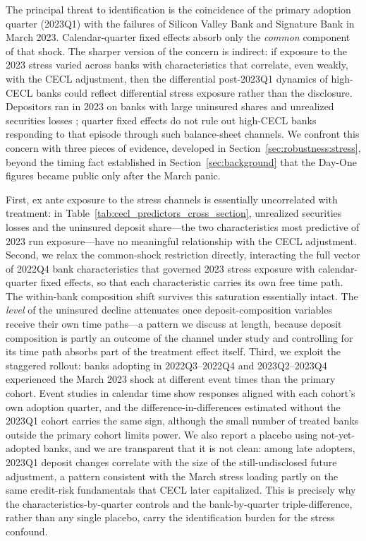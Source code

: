 The principal threat to identification is the coincidence of the primary
adoption quarter (2023Q1) with the failures of Silicon Valley Bank and
Signature Bank in March 2023.  Calendar-quarter fixed effects absorb only the
\emph{common} component of that shock.  The sharper version of the concern is
indirect: if exposure to the 2023 stress varied across banks with
characteristics that correlate, even weakly, with the CECL adjustment, then
the differential post-2023Q1 dynamics of high-CECL banks could reflect
differential stress exposure rather than the disclosure.  Depositors ran in
2023 on banks with large uninsured shares and unrealized securities losses
\citep{caglio2024depositors, jiang2024monetary}; quarter fixed effects do not
rule out high-CECL banks responding to that episode through such balance-sheet
channels.  We confront this concern with three pieces of evidence, developed
in Section~\ref{sec:robustness:stress}, beyond the timing fact established in
Section~\ref{sec:background} that the Day-One figures became public only after
the March panic.

First, ex ante exposure to the stress channels is essentially uncorrelated
with treatment: in Table~\ref{tab:cecl_predictors_cross_section}, unrealized
securities losses and the uninsured deposit share---the two characteristics
most predictive of 2023 run exposure---have no meaningful relationship with
the CECL adjustment.  Second, we relax the common-shock restriction directly,
interacting the full vector of 2022Q4 bank characteristics that governed 2023
stress exposure with calendar-quarter fixed effects, so that each
characteristic carries its own free time path.  The within-bank composition
shift survives this saturation essentially intact.  The \emph{level} of the
uninsured decline attenuates once deposit-composition variables receive their
own time paths---a pattern we discuss at length, because deposit composition
is partly an outcome of the channel under study and controlling for its time
path absorbs part of the treatment effect itself.  Third, we exploit the
staggered rollout: banks adopting in 2022Q3--2022Q4 and 2023Q2--2023Q4
experienced the March 2023 shock at different event times than the primary
cohort.  Event studies in calendar time show responses aligned with each
cohort's own adoption quarter, and the difference-in-differences estimated
without the 2023Q1 cohort carries the same sign, although the small number of
treated banks outside the primary cohort limits power.  We also report a
placebo using not-yet-adopted banks, and we are transparent that it is not
clean: among late adopters, 2023Q1 deposit changes correlate with the size of
the still-undisclosed future adjustment, a pattern consistent with the March
stress loading partly on the same credit-risk fundamentals that CECL later
capitalized.  This is precisely why the characteristics-by-quarter controls
and the bank-by-quarter triple-difference, rather than any single placebo,
carry the identification burden for the stress confound.

